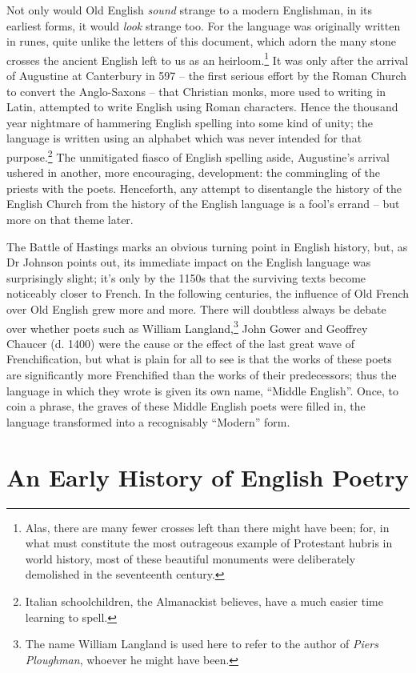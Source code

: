 \documentclass[0main.tex]{subfiles}
\begin{document}
Not only would Old English \emph{sound} strange to a modern Englishman, in its earliest forms, it would \emph{look} strange too. For the language was originally written in runes, quite unlike the letters of this document, which adorn the many stone crosses the ancient English left to us as an heirloom.\footnote{Alas, there are many fewer crosses left than there might have been; for, in what must constitute the most outrageous example of Protestant hubris in world history, most of these beautiful monuments were deliberately demolished in the seventeenth century.} It was only after the arrival of Augustine at Canterbury in 597 -- the first serious effort by the Roman Church to convert the Anglo-Saxons -- that Christian monks, more used to writing in Latin, attempted to write English using Roman characters. Hence the thousand year nightmare of hammering English spelling into some kind of unity; the language is written using an alphabet which was never intended for that purpose.\footnote{Italian schoolchildren, the Almanackist believes, have a much easier time learning to spell.} The unmitigated fiasco of English spelling aside, Augustine's arrival ushered in another, more encouraging, development: the commingling of the priests with the poets. Henceforth, any attempt to disentangle the history of the English Church from the history of the English language is a fool's errand -- but more on that theme later.

The Battle of Hastings marks an obvious turning point in English history, but, as Dr Johnson points out, its immediate impact on the English language was surprisingly slight; it's only by the 1150s that the surviving texts become noticeably closer to French. In the following centuries, the influence of Old French over Old English grew more and more. There will doubtless always be debate over whether poets such as William Langland,\footnote{The name William Langland is used here to refer to the author of \emph{Piers Ploughman}, whoever he might have been.} John Gower and Geoffrey Chaucer (d. 1400) were the cause or the effect of the last great wave of Frenchification, but what is plain for all to see is that the works of these poets are significantly more Frenchified than the works of their predecessors; thus the language in which they wrote is given its own name, ``Middle English''. Once, to coin a phrase, the graves of these Middle English poets were filled in, the language transformed into a recognisably ``Modern'' form.

\bigskip

\section{An Early History of English Poetry}
\end{document}

